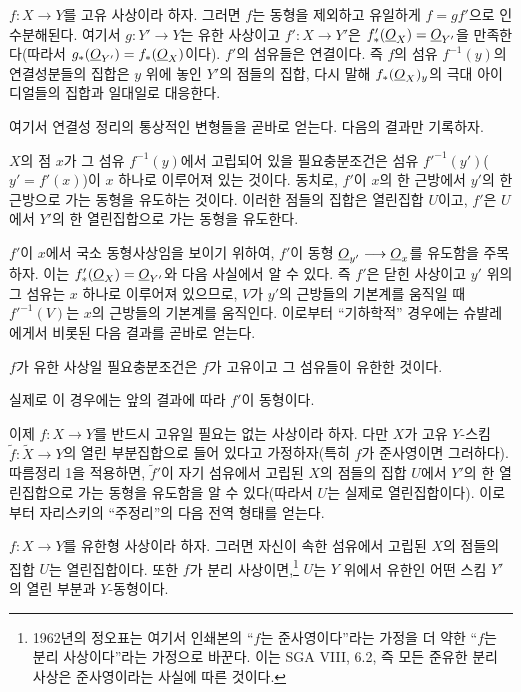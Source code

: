  $f:X\longrightarrow Y$를
고유 사상이라 하자. 그러면 $f$는 동형을 제외하고 유일하게 $f=gf'$으로
인수분해된다. 여기서 $g:Y'\longrightarrow Y$는 유한 사상이고
$f':X\longrightarrow Y'$은 $f'_*(\underline{O}_X)=\underline{O}_{Y'}$을 만족한다(따라서
$g_*(\underline{O}_{Y'})=f_*(\underline{O}_X)$이다). $f'$의 섬유들은 연결이다. 즉 $f$의
섬유 $f^{-1}(y)$의 연결성분들의 집합은 $y$ 위에 놓인 $Y'$의 점들의
집합, 다시 말해 $f_*(\underline{O}_X)_y$의 극대 아이디얼들의 집합과 일대일로
대응한다.

여기서 연결성 정리의 통상적인 변형들을 곧바로 얻는다. 다음의 결과만
기록하자.

 $X$의 점 $x$가 그 섬유 $f^{-1}(y)$에서 고립되어
있을 필요충분조건은 섬유 $f'^{-1}(y')$($y'=f'(x)$)이 $x$ 하나로
이루어져 있는 것이다. 동치로, $f'$이 $x$의 한 근방에서 $y'$의 한
근방으로 가는 동형을 유도하는 것이다. 이러한 점들의 집합은 열린집합
$U$이고, $f'$은 $U$에서 $Y'$의 한 열린집합으로 가는 동형을 유도한다.

$f'$이 $x$에서 국소 동형사상임을 보이기 위하여, $f'$이 동형
$\underline{O}_{y'}\longrightarrow\underline{O}_x$를 유도함을 주목하자. 이는
$f'_*(\underline{O}_X)=\underline{O}_{Y'}$와 다음 사실에서 알 수 있다. 즉 $f'$은 닫힌
사상이고 $y'$ 위의 그 섬유는 $x$ 하나로 이루어져 있으므로, $V$가
$y'$의 근방들의 기본계를 움직일 때 $f'^{-1}(V)$는 $x$의 근방들의
기본계를 움직인다. 이로부터 ``기하학적'' 경우에는 슈발레에게서 비롯된
다음 결과를 곧바로 얻는다.

 $f$가 유한 사상일 필요충분조건은 $f$가 고유이고
그 섬유들이 유한한 것이다.

실제로 이 경우에는 앞의 결과에 따라 $f'$이 동형이다.

이제 $f:X\longrightarrow Y$를 반드시 고유일 필요는 없는 사상이라 하자.
다만 $X$가 고유 $Y$-스킴
$\widetilde f:\widetilde X\longrightarrow Y$의 열린 부분집합으로 들어
있다고 가정하자(특히 $f$가 준사영이면 그러하다). 따름정리 1을 적용하면,
$\widetilde f'$이 자기 섬유에서 고립된 $X$의 점들의 집합 $U$에서
$Y'$의 한 열린집합으로 가는 동형을 유도함을 알 수 있다(따라서 $U$는
실제로 열린집합이다). 이로부터 자리스키의 ``주정리''의 다음 전역 형태를
얻는다.

 $f:X\longrightarrow Y$를
유한형 사상이라 하자. 그러면 자신이 속한 섬유에서 고립된 $X$의 점들의 집합
$U$는 열린집합이다. 또한 $f$가 분리 사상이면,\footnote{1962년의 정오표는
여기서 인쇄본의 ``$f$는 준사영이다''라는 가정을 더 약한 ``$f$는 분리
사상이다''라는 가정으로 바꾼다. 이는 SGA VIII, 6.2, 즉 모든 준유한 분리
사상은 준사영이라는 사실에 따른 것이다.} $U$는 $Y$ 위에서 유한인 어떤
스킴 $Y'$의 열린 부분과 $Y$-동형이다.

